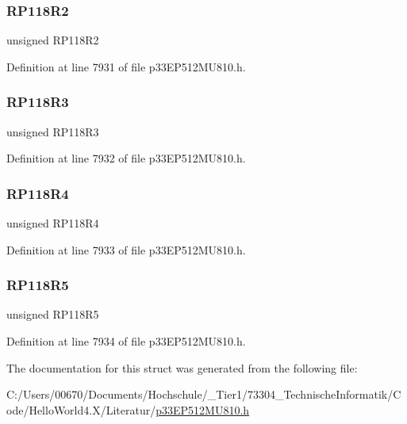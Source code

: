 \subsubsection{\texorpdfstring{R\+P118\+R2}{RP118R2}}
{\footnotesize\ttfamily unsigned R\+P118\+R2}



Definition at line 7931 of file p33\+E\+P512\+M\+U810.\+h.

\mbox{\label{structtag_r_p_o_r13_b_i_t_s_a5416b23811d36e807551b2ec3318d965}} 
\subsubsection{\texorpdfstring{R\+P118\+R3}{RP118R3}}
{\footnotesize\ttfamily unsigned R\+P118\+R3}



Definition at line 7932 of file p33\+E\+P512\+M\+U810.\+h.

\mbox{\label{structtag_r_p_o_r13_b_i_t_s_a922632ab1666b5a3324ce7a18fc4f842}} 
\subsubsection{\texorpdfstring{R\+P118\+R4}{RP118R4}}
{\footnotesize\ttfamily unsigned R\+P118\+R4}



Definition at line 7933 of file p33\+E\+P512\+M\+U810.\+h.

\mbox{\label{structtag_r_p_o_r13_b_i_t_s_a9c1687d985da6bd95f9febe7d6bdc160}} 
\subsubsection{\texorpdfstring{R\+P118\+R5}{RP118R5}}
{\footnotesize\ttfamily unsigned R\+P118\+R5}



Definition at line 7934 of file p33\+E\+P512\+M\+U810.\+h.



The documentation for this struct was generated from the following file\+:\begin{DoxyCompactItemize}
\item 
C\+:/\+Users/00670/\+Documents/\+Hochschule/\+\_\+\+Tier1/73304\+\_\+\+Technische\+Informatik/\+Code/\+Hello\+World4.\+X/\+Literatur/\hyperlink{p33_e_p512_m_u810_8h}{p33\+E\+P512\+M\+U810.\+h}\end{DoxyCompactItemize}
